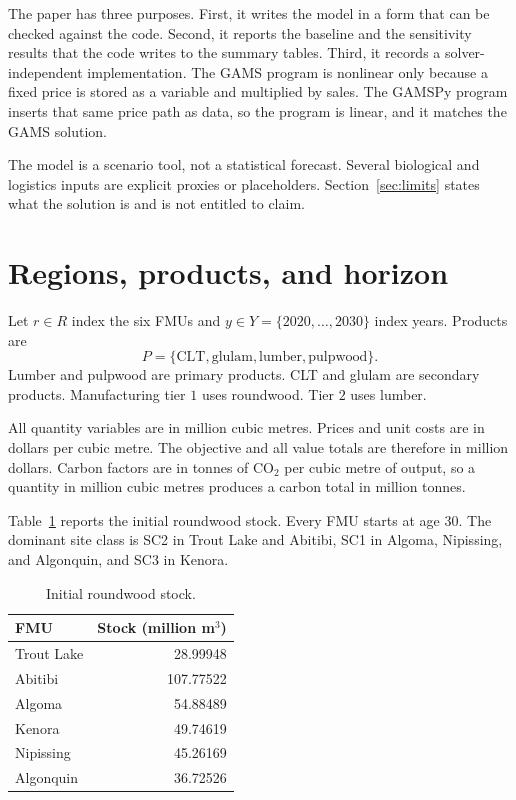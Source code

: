 \documentclass[11pt]{article}
\begin{document}
The paper has three purposes. First, it writes the model in a form that can be checked against the code. Second, it reports the baseline and the sensitivity results that the code writes to the summary tables. Third, it records a solver-independent implementation. The GAMS program is nonlinear only because a fixed price is stored as a variable and multiplied by sales. The GAMSPy program inserts that same price path as data, so the program is linear, and it matches the GAMS solution.

The model is a scenario tool, not a statistical forecast. Several biological and logistics inputs are explicit proxies or placeholders. Section~\ref{sec:limits} states what the solution is and is not entitled to claim.

\section{Regions, products, and horizon}

Let $r \in R$ index the six FMUs and $y \in Y = \{2020,\ldots,2030\}$ index years. Products are
\[
P = \{\text{CLT}, \text{glulam}, \text{lumber}, \text{pulpwood}\}.
\]
Lumber and pulpwood are primary products. CLT and glulam are secondary products. Manufacturing tier $1$ uses roundwood. Tier $2$ uses lumber.

All quantity variables are in million cubic metres. Prices and unit costs are in dollars per cubic metre. The objective and all value totals are therefore in million dollars. Carbon factors are in tonnes of CO$_2$ per cubic metre of output, so a quantity in million cubic metres produces a carbon total in million tonnes.

Table~\ref{tab:stock} reports the initial roundwood stock. Every FMU starts at age 30. The dominant site class is SC2 in Trout Lake and Abitibi, SC1 in Algoma, Nipissing, and Algonquin, and SC3 in Kenora.

\begin{table}[ht]
\centering
\caption{Initial roundwood stock.}
\label{tab:stock}
\begin{tabular}{lr}
\toprule
FMU & Stock (million m$^3$) \\
\midrule
Trout Lake & 28.99948 \\
Abitibi & 107.77522 \\
Algoma & 54.88489 \\
Kenora & 49.74619 \\
Nipissing & 45.26169 \\
Algonquin & 36.72526 \\
\bottomrule
\end{tabular}
\end{table}
\end{document}
